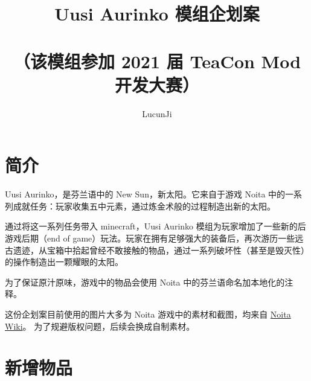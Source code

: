\documentclass[11pt]{article}
\title{Uusi Aurinko 模组企划案\\
\ \\
\small{（该模组参加 2021 届 TeaCon Mod 开发大赛）}}
\author{LucunJi}
\begin{document}
    \maketitle
    \tableofcontents

    \clearpage
    \section{简介}\label{sec:intro}
    Uusi Aurinko，是芬兰语中的 New Sun，新太阳。它来自于游戏 Noita 中的一系列成就任务：玩家收集五中元素，通过炼金术般的过程制造出新的太阳。

    通过将这一系列任务带入 minecraft，Uusi Aurinko 模组为玩家增加了一些新的后游戏后期（end of game）玩法。玩家在拥有足够强大的装备后，再次游历一些远古遗迹，从宝箱中拾起曾经不敢接触的物品，通过一系列破坏性（甚至是毁灭性）的操作制造出一颗耀眼的太阳。

    为了保证原汁原味，游戏中的物品会使用 Noita 中的芬兰语命名加本地化的注释。

    \vspace{1em}
    这份企划案目前使用的图片大多为 Noita 游戏中的素材和截图，均来自 \href{https://noita.fandom.com/wiki/Noita_Wiki}{Noita Wiki}。
    为了规避版权问题，后续会换成自制素材。

    \clearpage
    \section{新增物品}\label{sec:new-items}
\end{document}
